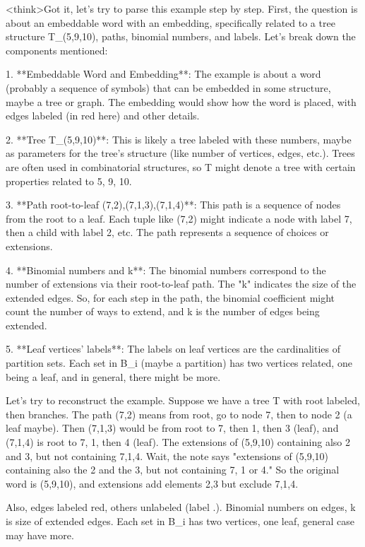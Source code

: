 <think>Got it, let's try to parse this example step by step. First, the question is about an embeddable word with an embedding, specifically related to a tree structure T_(5,9,10), paths, binomial numbers, and labels. Let's break down the components mentioned:

1. **Embeddable Word and Embedding**: The example is about a word (probably a sequence of symbols) that can be embedded in some structure, maybe a tree or graph. The embedding would show how the word is placed, with edges labeled (in red here) and other details.

2. **Tree T_(5,9,10)**: This is likely a tree labeled with these numbers, maybe as parameters for the tree's structure (like number of vertices, edges, etc.). Trees are often used in combinatorial structures, so T might denote a tree with certain properties related to 5, 9, 10.

3. **Path root-to-leaf (7,2),(7,1,3),(7,1,4)**: This path is a sequence of nodes from the root to a leaf. Each tuple like (7,2) might indicate a node with label 7, then a child with label 2, etc. The path represents a sequence of choices or extensions.

4. **Binomial numbers and k**: The binomial numbers correspond to the number of extensions via their root-to-leaf path. The "k" indicates the size of the extended edges. So, for each step in the path, the binomial coefficient might count the number of ways to extend, and k is the number of edges being extended.

5. **Leaf vertices' labels**: The labels on leaf vertices are the cardinalities of partition sets. Each set in B_i (maybe a partition) has two vertices related, one being a leaf, and in general, there might be more.

Let's try to reconstruct the example. Suppose we have a tree T with root labeled, then branches. The path (7,2) means from root, go to node 7, then to node 2 (a leaf maybe). Then (7,1,3) would be from root to 7, then 1, then 3 (leaf), and (7,1,4) is root to 7, 1, then 4 (leaf). The extensions of (5,9,10) containing also 2 and 3, but not containing 7,1,4. Wait, the note says "extensions of (5,9,10) containing also the 2 and the 3, but not containing 7, 1 or 4." So the original word is (5,9,10), and extensions add elements 2,3 but exclude 7,1,4.

Also, edges labeled red, others unlabeled (label .). Binomial numbers on edges, k is size of extended edges. Each set in B_i has two vertices, one leaf, general case may have more.

